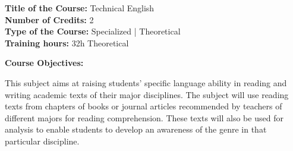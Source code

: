 \documentclass[12pt,a4paper]{article}
\begin{document}
\newpage
\textbf{Title of the Course:} Technical English\\
\textbf{Number of Credits:} 2\\
\textbf{Type of the Course:} Specialized | Theoretical\\
\textbf{Training hours:} 32h Theoretical\par\vspace{4pt}
\textbf{Course Objectives:}\par\vspace{2pt}
This subject aims at raising students’ specific language ability in reading and writing academic
texts of their major disciplines. The subject will use reading texts from chapters of books or journal
articles recommended by teachers of different majors for reading comprehension. These texts will
also be used for analysis to enable students to develop an awareness of the genre in that particular
discipline.\par\vspace{4pt}
\end{document}
